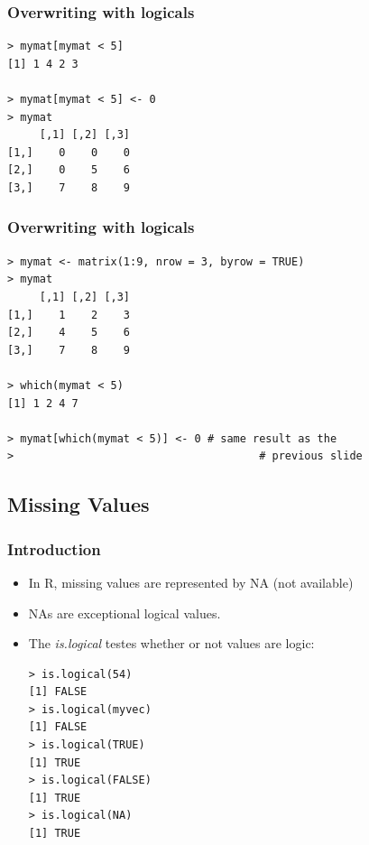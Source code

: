 \documentclass[xcolor=dvipsnames, xcolor=table]{beamer} %
\theoremstyle{mystyle}
\begin{document}
\begin{frame}[fragile] %

\frametitle{Overwriting with logicals}

\begin{verbatim}
> mymat[mymat < 5]
[1] 1 4 2 3

> mymat[mymat < 5] <- 0
> mymat
     [,1] [,2] [,3]
[1,]    0    0    0
[2,]    0    5    6
[3,]    7    8    9
\end{verbatim}

\end{frame}

\begin{frame}[fragile] %

\frametitle{Overwriting with logicals}

\begin{verbatim}
> mymat <- matrix(1:9, nrow = 3, byrow = TRUE)
> mymat
     [,1] [,2] [,3]
[1,]    1    2    3
[2,]    4    5    6
[3,]    7    8    9

> which(mymat < 5)
[1] 1 2 4 7

> mymat[which(mymat < 5)] <- 0 # same result as the  
>   								   # previous slide
\end{verbatim}

\end{frame}

\subsection{Missing Values}

\begin{frame}[fragile] %

\frametitle{Introduction}

\begin{itemize}
\item In R, missing values are represented by NA (not available)
\item NAs are exceptional logical values.
\item The \textit{is.logical} testes whether or not values are logic:

\begin{verbatim}
> is.logical(54)
[1] FALSE
> is.logical(myvec)
[1] FALSE
> is.logical(TRUE)
[1] TRUE
> is.logical(FALSE)
[1] TRUE
> is.logical(NA)
[1] TRUE
\end{verbatim}

\end{itemize}

\end{frame}
\end{document}
